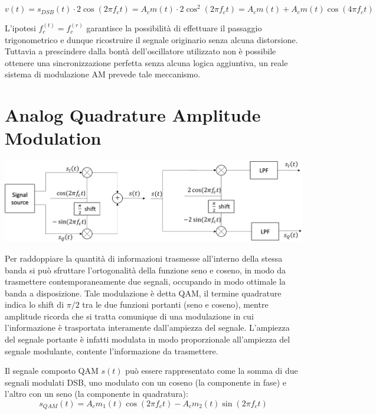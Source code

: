 \begin{equation*}
    v(t) = s_{DSB}(t) \cdot 2\cos(2\pi f_c t) = A_c m(t) \cdot 2\cos^2(2\pi f_c t) = A_c m(t) + A_c m(t) \cos(4\pi f_c t)
\end{equation*}

L'ipotesi $f_c^{(t)} = f_c^{(r)}$ garantisce la possibilità di effettuare il passaggio trigonometrico e dunque ricostruire il segnale originario senza alcuna distorsione. Tuttavia a prescindere dalla bontà dell'oscillatore utilizzato non è possibile ottenere una sincronizzazione perfetta senza alcuna logica aggiuntiva, un reale sistema di modulazione AM prevede tale meccanismo.

\section*{Analog Quadrature Amplitude Modulation}

\begin{center}
    \includegraphics[width=1\textwidth]{imgs/analog_qam.png}
\end{center}

Per raddoppiare la quantità di informazioni trasmesse all'interno della stessa banda si può sfruttare l'ortogonalità della funzione seno e coseno, in modo da trasmettere contemporaneamente due segnali, occupando in modo ottimale la banda a disposizione. Tale modulazione è detta QAM, il termine quadrature indica lo shift di $\pi/2$ tra le due funzioni portanti (seno e coseno), mentre amplitude ricorda che si tratta comunique di una modulazione in cui l'informazione è trasportata interamente dall'ampiezza del segnale. L'ampiezza del segnale portante è infatti modulata in modo proporzionale all'ampiezza del segnale modulante, contente l'informazione da trasmettere.


Il segnale composto QAM \( s(t) \) può essere rappresentato come la somma di due segnali modulati DSB, uno modulato con un coseno (la componente in fase) e l'altro con un seno (la componente in quadratura):
\begin{equation}
    s_{QAM}(t) = A_{c} m_1(t) \cos(2\pi f_c t) - A_{c} m_2(t) \sin(2\pi f_c t)
\end{equation}

